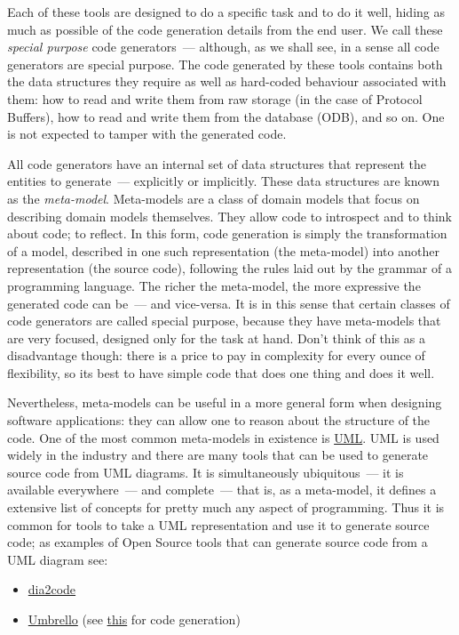 \documentclass{book}
\begin{document}
Each of these tools are designed to do a specific task and to do it
well, hiding as much as possible of the code generation details from
the end user. We call these \emph{special purpose} code generators~---
although, as we shall see, in a sense all code generators are special
purpose. The code generated by these tools contains both the data
structures they require as well as hard-coded behaviour associated
with them: how to read and write them from raw storage (in the case of
Protocol Buffers), how to read and write them from the database (ODB),
and so on. One is not expected to tamper with the generated code.

All code generators have an internal set of data structures that
represent the entities to generate~--- explicitly or implicitly. These
data structures are known as the \emph{meta-model}. Meta-models are a
class of domain models that focus on describing domain models
themselves. They allow code to introspect and to think about code; to
reflect. In this form, code generation is simply the transformation of
a model, described in one such representation (the meta-model) into
another representation (the source code), following the rules laid out
by the grammar of a programming language. The richer the meta-model,
the more expressive the generated code can be~--- and vice-versa. It
is in this sense that certain classes of code generators are called
special purpose, because they have meta-models that are very focused,
designed only for the task at hand. Don't think of this as a
disadvantage though: there is a price to pay in complexity for every
ounce of flexibility, so its best to have simple code that does one
thing and does it well.

Nevertheless, meta-models can be useful in a more general form when
designing software applications: they can allow one to reason about
the structure of the code. One of the most common meta-models in
existence is
\href{http://en.wikipedia.org/wiki/Unified_Modeling_Language}{UML}. UML
is used widely in the industry and there are many tools that can be
used to generate source code from UML diagrams. It is simultaneously
ubiquitous~--- it is available everywhere~--- and complete~--- that
is, as a meta-model, it defines a extensive list of concepts for
pretty much any aspect of programming. Thus it is common for tools to
take a UML representation and use it to generate source code; as
examples of Open Source tools that can generate source code from a UML
diagram see:

\begin{itemize}
\item \href{http://dia2code.sourceforge.net/}{dia2code}
\item \href{http://umbrello.kde.org/}{Umbrello} (see \href{http://docs.kde.org/development/en/kdesdk/umbrello/code-import-generation.html}{this} for code generation)
\end{itemize}
\end{document}
